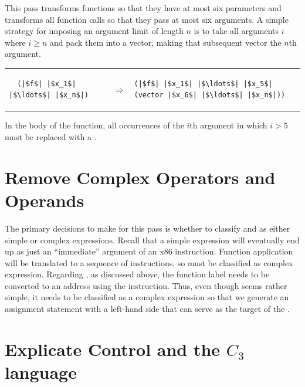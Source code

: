 \documentclass[11pt]{book}
\begin{document}
This pass transforms functions so that they have at most six
parameters and transforms all function calls so that they pass at most
six arguments.  A simple strategy for imposing an argument limit of
length $n$ is to take all arguments $i$ where $i \geq n$ and pack them
into a vector, making that subsequent vector the $n$th argument.

\begin{tabular}{lll}
\begin{minipage}{0.2\textwidth}
\begin{lstlisting}
  (|$f$| |$x_1$| |$\ldots$| |$x_n$|) 
\end{lstlisting}
\end{minipage}
&
$\Rightarrow$
&
\begin{minipage}{0.4\textwidth}
\begin{lstlisting}
(|$f$| |$x_1$| |$\ldots$| |$x_5$| (vector |$x_6$| |$\ldots$| |$x_n$|))
\end{lstlisting}
\end{minipage}
\end{tabular}

In the body of the function, all occurrences of the $i$th argument in
which $i>5$ must be replaced with a .

\section{Remove Complex Operators and Operands}
\label{sec:rco-r4}

The primary decisions to make for this pass is whether to classify
 and  as either simple or complex
expressions. Recall that a simple expression will eventually end up as
just an ``immediate'' argument of an x86 instruction. Function
application will be translated to a sequence of instructions, so
 must be classified as complex expression. Regarding
, as discussed above, the function label needs to
be converted to an address using the  instruction. Thus,
even though  seems rather simple, it needs to be
classified as a complex expression so that we generate an assignment
statement with a left-hand side that can serve as the target of the
.

\section{Explicate Control and the $C_3$ language}
\label{sec:explicate-control-r4}
\end{document}
